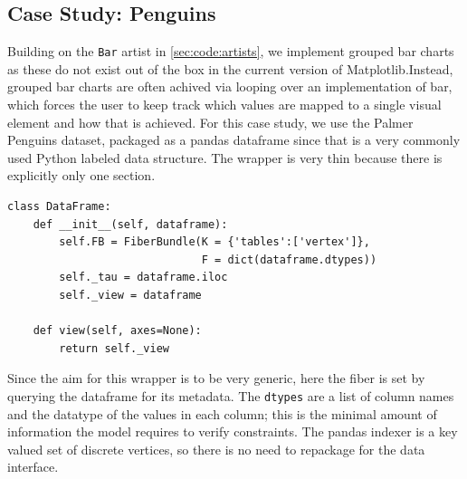 \documentclass[../main.tex]{subfiles}
\begin{document}
\subsection{Case Study: Penguins}
\label{sec:code_case_study}
Building on the \texttt{Bar} artist in \autoref{sec:code:artists}, we implement grouped bar charts as these do not exist out of the box in the current version of Matplotlib.Instead, grouped bar charts are often achived via looping over an implementation of bar, which forces the user to keep track which values are mapped to a single visual element and how that is achieved. For this case study, we use the Palmer Penguins dataset\cite{gormanEcologicalSexualDimorphism2014, horstPalmerpenguinsPalmerArchipelago2020}, packaged as a pandas dataframe\cite{nakhaeeMcnakhaeePalmerpenguins2021} since that is a very commonly used Python labeled data structure. The wrapper is very thin because there is explicitly only one section.
\begin{verbatim}
class DataFrame:
    def __init__(self, dataframe):
        self.FB = FiberBundle(K = {'tables':['vertex']},
                              F = dict(dataframe.dtypes))
        self._tau = dataframe.iloc
        self._view = dataframe

    def view(self, axes=None):
        return self._view
\end{verbatim}
Since the aim for this wrapper is to be very generic, here the fiber is set by querying the dataframe for its metadata. The \texttt{dtypes} are a list of column names and the datatype of the values in each column; this is the minimal amount of information the model requires to verify constraints. The pandas indexer is a key valued set of discrete vertices, so there is no need to repackage for the data interface. 
\end{document}
